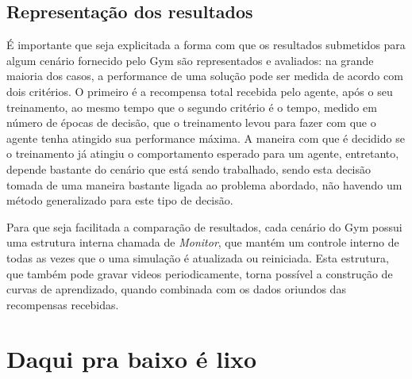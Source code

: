 \documentclass[cic,tc]{iiufrgs}
\begin{document}
\subsection{Representação dos resultados}
É importante que seja explicitada a forma com que os resultados submetidos para
algum cenário fornecido pelo Gym são representados e avaliados: na grande
maioria dos casos, a performance de uma solução pode ser medida de acordo com
dois critérios. O primeiro é a recompensa total recebida pelo agente, após o seu
treinamento, ao mesmo tempo que o segundo critério é o tempo, medido em número
de épocas de decisão, que o treinamento levou para fazer com que o agente tenha
atingido sua performance máxima. A maneira com que é decidido se o treinamento
já atingiu o comportamento esperado para um agente, entretanto, depende bastante
do cenário que está sendo trabalhado, sendo esta decisão tomada de uma maneira
bastante ligada ao problema abordado, não havendo um método generalizado para
este tipo de decisão.


Para que seja facilitada a comparação de resultados, cada cenário do Gym possui
uma estrutura interna chamada de \textit{Monitor}, que mantém um controle
interno de todas as vezes que o uma simulação é atualizada ou reiniciada. Esta
estrutura, que também pode gravar videos periodicamente, torna possível a
construção de curvas de aprendizado, quando combinada com os dados oriundos das
recompensas recebidas.

\section{Daqui pra baixo é lixo}
\end{document}
